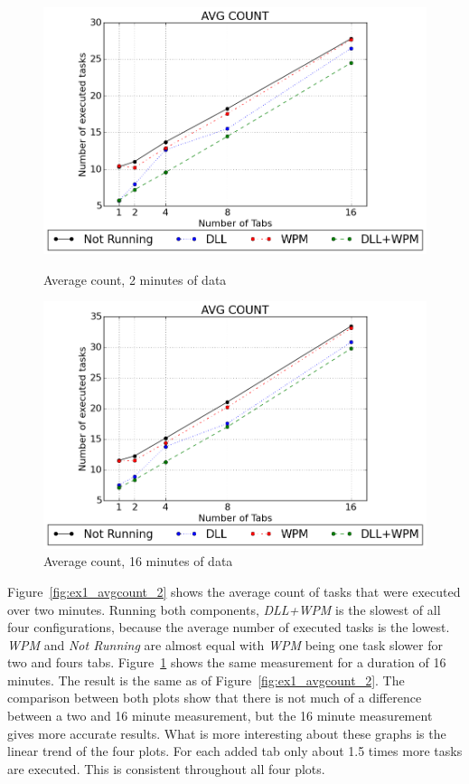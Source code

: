 \begin{figure}[h]
	\centering
    \includegraphics[width=\textwidth,height=0.45\textheight,keepaspectratio]{Evaluation/experiment1/AVG-COUNT-2.png}
    \caption{Average count, 2 minutes of data}
    \label{fig:ex1_avgcount_2}

  	\vspace*{\floatsep}
  	
    \includegraphics[width=\textwidth,height=0.45\textheight,keepaspectratio]{Evaluation/experiment1/AVG-COUNT-16.png}
    \caption{Average count, 16 minutes of data}
    \label{fig:ex1_avgcount_16}
\end{figure}
Figure~\ref{fig:ex1_avgcount_2} shows the average count of tasks that were executed over two minutes. Running both components, \emph{\gls{DLL}+\gls{WPM}} is the slowest of all four configurations, because the average number of executed tasks is the lowest. \emph{WPM} and \emph{Not Running} are almost equal with \emph{\gls{WPM}} being one task slower for two and fours tabs. Figure~\ref{fig:ex1_avgcount_16} shows the same measurement for a duration of 16 minutes. The result is the same as of Figure~\ref{fig:ex1_avgcount_2}. The comparison between both plots show that there is not much of a difference between a two and 16 minute measurement, but the 16 minute measurement gives more accurate results. What is more interesting about these graphs is the linear trend of the four plots. For each added tab only about 1.5 times more tasks are executed. This is consistent throughout all four plots.
